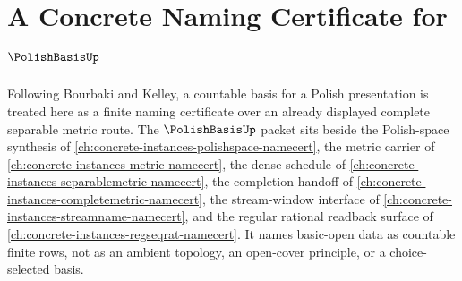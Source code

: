 \chapter{A Concrete Naming Certificate for $\PolishBasisUp$}
\label{ch:concrete-instances-polish-basis-namecert}

Following Bourbaki and Kelley, a countable basis for a Polish presentation is treated here as a finite naming certificate over an already displayed complete separable metric route. The $\PolishBasisUp$ packet sits beside the Polish-space synthesis of \autoref{ch:concrete-instances-polishspace-namecert}, the metric carrier of \autoref{ch:concrete-instances-metric-namecert}, the dense schedule of \autoref{ch:concrete-instances-separablemetric-namecert}, the completion handoff of \autoref{ch:concrete-instances-completemetric-namecert}, the stream-window interface of \autoref{ch:concrete-instances-streamname-namecert}, and the regular rational readback surface of \autoref{ch:concrete-instances-regseqrat-namecert}. It names basic-open data as countable finite rows, not as an ambient topology, an open-cover principle, or a choice-selected basis.


